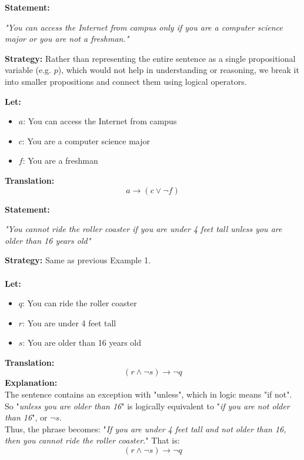 \begin{tcolorbox}[title=Example 1: Translating from English to a Logical Expression]
\textbf{Statement:}  
\begin{center}
\textit{"You can access the Internet from campus only if you are a computer science major or you are not a freshman."}
\end{center}

\textbf{Strategy:}  
Rather than representing the entire sentence as a single propositional variable (e.g. $p$), which would not help in understanding or reasoning, we break it into smaller propositions and connect them using logical operators.

\vspace{1em}

\textbf{Let:}
\begin{itemize}
  \item $a$: You can access the Internet from campus
  \item $c$: You are a computer science major
  \item $f$: You are a freshman
\end{itemize}

\vspace{0.5em}

\textbf{Translation:}
\[
a \rightarrow (c \lor \neg f)
\]
\end{tcolorbox}
\begin{tcolorbox}[title=Example 2: Translating from English to a Logical Expression]
\textbf{Statement:}  
\begin{center}
\textit{"You cannot ride the roller coaster if you are under 4 feet tall unless you are older than 16
years old"}
\end{center}

\textbf{Strategy:}  
Same as previous Example 1. \\ \\
\textbf{Let:}
\begin{itemize}
  \item $q$: You can ride the roller coaster
  \item $r$: You are under 4 feet tall
  \item $s$: You are older than 16 years old
\end{itemize}

\vspace{0.5em}

\textbf{Translation:}
\[
(r \land \neg s) \rightarrow \neg q
\]
\textbf{Explanation:}  \\
The sentence contains an exception with "unless", which in logic means "if not".  \\
So "\textit{unless you are older than 16}" is logically equivalent to "\textit{if you are not older than 16}", or $\neg s$. \\
Thus, the phrase becomes:  
"\textit{If you are under 4 feet tall and not older than 16, then you cannot ride the roller coaster.}"
That is:
\[
(r \land \neg s) \rightarrow \neg q
\]

\end{tcolorbox}

